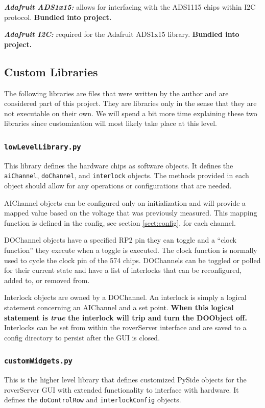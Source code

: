 \documentclass{article}
\begin{document}
\noindent
\textbf{\emph{Adafruit ADS1x15:}} allows for interfacing with the ADS1115 chips within I2C protocol. \textbf{Bundled into project.}

\noindent
\textbf{\emph{Adafruit I2C:}} required for the Adafruit ADS1x15 library. \textbf{Bundled into project.}


\subsection{Custom Libraries}
The following libraries are files that were written by the author and are considered part of this project. They are libraries only in the sense that they are not executable on their own. We will spend a bit more time explaining these two libraries since customization will most likely take place at this level.


\subsubsection{\texttt{lowLevelLibrary.py}}
This library defines the hardware chips as software objects. It defines the \texttt{aiChannel}, \texttt{doChannel}, and \texttt{interlock} objects. The methods provided in each object should allow for any operations or configurations that are needed.

AIChannel objects can be configured only on initialization and will provide a mapped value based on the voltage that was previously measured. This mapping function is defined in the config, see section \ref{sect:config}, for each channel.

DOChannel objects have a specified RP2 pin they can toggle and a ``clock function'' they execute when a toggle is executed. The clock function is normally used to cycle the clock pin of the 574 chips. DOChannels can be toggled or polled for their current state and have a list of interlocks that can be reconfigured, added to, or removed from.

Interlock objects are owned by a DOChannel. An interlock is simply a logical statement concerning an AIChannel and a set point. \textbf{When this logical statement is \emph{true} the interlock will trip and turn the DOObject off.} Interlocks can be set from within the roverServer interface and are saved to a config directory to persist after the GUI is closed. 


\subsubsection{\texttt{customWidgets.py}}
This is the higher level library that defines customized PySide objects for the roverServer GUI with extended functionality to interface with hardware. It defines the \texttt{doControlRow} and \texttt{interlockConfig} objects.
\end{document}
